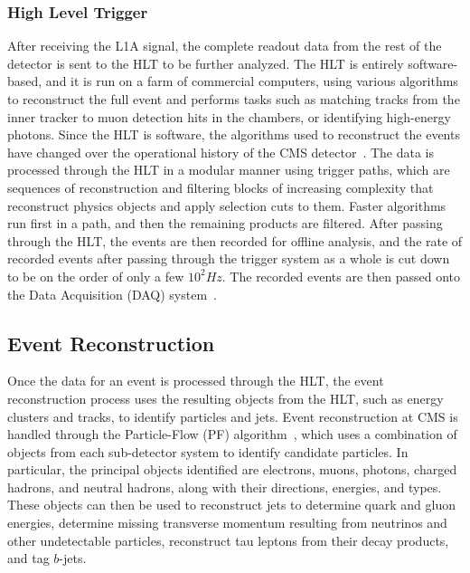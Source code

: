 \subsubsection{High Level Trigger}

After receiving the L1A signal, the complete readout data from the rest of the detector is sent to the HLT to be further analyzed.
The HLT is entirely software-based, and it is run on a farm of commercial computers, using various algorithms to reconstruct the full event and performs tasks such as matching tracks from the inner tracker to muon detection hits in the chambers, or identifying high-energy photons.
Since the HLT is software, the algorithms used to reconstruct the events have changed over the operational history of the CMS detector~\cite{Trocino_2014}.
The data is processed through the HLT in a modular manner using trigger paths, which are sequences of reconstruction and filtering blocks of increasing complexity that reconstruct physics objects and apply selection cuts to them.
Faster algorithms run first in a path, and then the remaining products are filtered.
After passing through the HLT, the events are then recorded for offline analysis, and the rate of recorded events after passing through the trigger system as a whole is cut down to be on the order of only a few $10^2\unit{Hz}$.
The recorded events are then passed onto the Data Acquisition (DAQ) system~\cite{Cittolin:578006}.

\subsection{Event Reconstruction}

Once the data for an event is processed through the HLT, the event reconstruction process uses the resulting objects from the HLT, such as energy clusters and tracks, to identify particles and jets.
Event reconstruction at CMS is handled through the Particle-Flow (PF) algorithm~\cite{CMS-PAS-PFT-09-001,CMS-PAS-PFT-10-001}, which uses a combination of objects from each sub-detector system to identify candidate particles.
In particular, the principal objects identified are electrons, muons, photons, charged hadrons, and neutral hadrons, along with their directions, energies, and types.
These objects can then be used to reconstruct jets to determine quark and gluon energies, determine missing transverse momentum \ptmiss resulting from neutrinos and other undetectable particles, reconstruct tau leptons from their decay products, and tag $b$-jets.

